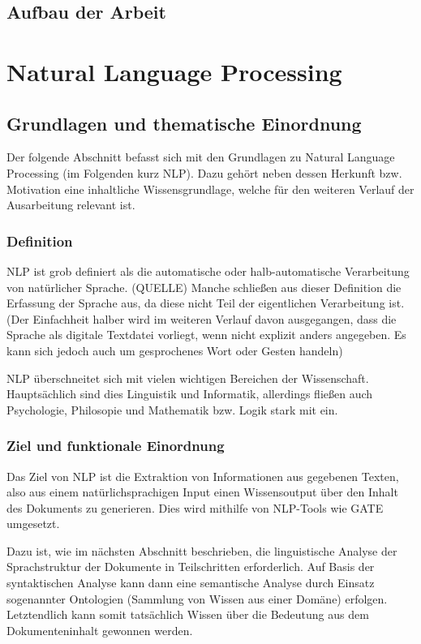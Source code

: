 \documentclass[12pt]{paper}
\begin{document}
\subsection{Aufbau der Arbeit}

\section{Natural Language Processing}
\subsection{Grundlagen und thematische Einordnung}
Der folgende Abschnitt befasst sich mit den Grundlagen zu Natural Language Processing (im Folgenden kurz NLP). Dazu gehört neben dessen Herkunft bzw. Motivation eine inhaltliche Wissensgrundlage, welche für den weiteren Verlauf der Ausarbeitung relevant ist. 

\subsubsection{Definition}
NLP ist grob definiert als die automatische oder halb-automatische Verarbeitung von natürlicher Sprache. (QUELLE) Manche schließen aus dieser Definition die Erfassung der Sprache aus, da diese nicht Teil der eigentlichen Verarbeitung ist. (Der Einfachheit halber wird im weiteren Verlauf davon ausgegangen, dass die Sprache als digitale Textdatei vorliegt, wenn nicht explizit anders angegeben. Es kann sich jedoch auch um gesprochenes Wort oder Gesten handeln)

NLP überschneitet sich mit vielen wichtigen Bereichen der Wissenschaft. Hauptsächlich sind dies Linguistik und Informatik, allerdings fließen auch Psychologie, Philosopie und Mathematik bzw. Logik stark mit ein. 

\subsubsection{Ziel und funktionale Einordnung}
Das Ziel von NLP ist die Extraktion von Informationen aus gegebenen Texten, also aus einem natürlichsprachigen Input einen Wissensoutput über den Inhalt des Dokuments zu generieren. Dies wird mithilfe von NLP-Tools wie GATE umgesetzt.

Dazu ist, wie im nächsten Abschnitt beschrieben, die linguistische Analyse der Sprachstruktur der Dokumente in Teilschritten erforderlich. Auf Basis der syntaktischen Analyse kann dann eine semantische Analyse durch Einsatz sogenannter Ontologien (Sammlung von Wissen aus einer Domäne) erfolgen. Letztendlich kann somit tatsächlich Wissen über die Bedeutung aus dem Dokumenteninhalt gewonnen werden.
\end{document}
